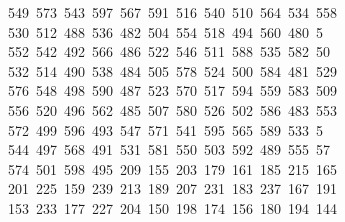 \begin{tabbing}
\>\ 549\ 573\ 543\ 597\ 567\ 591\ 516\ 540\ 510\ 564\ 534\ 558\ \\[0pt]
\ 530\ 512\ 488\ 536\ 482\ 504\ 554\ 518\ 494\ 560\ 480\ 5\\[0pt]
\ 552\ 542\ 492\ 566\ 486\ 522\ 546\ 511\ 588\ 535\ 582\ 50\\[0pt]
\ 532\ 514\ 490\ 538\ 484\ 505\ 578\ 524\ 500\ 584\ 481\ 529\\[0pt]
\>\ 576\ 548\ 498\ 590\ 487\ 523\ 570\ 517\ 594\ 559\ 583\ 509\\[0pt]
\>\ 556\ 520\ 496\ 562\ 485\ 507\ 580\ 526\ 502\ 586\ 483\ 553\ \\[0pt]
\ 572\ 499\ 596\ 493\ 547\ 571\ 541\ 595\ 565\ 589\ 533\ 5\\[0pt]
\ 544\ 497\ 568\ 491\ 531\ 581\ 550\ 503\ 592\ 489\ 555\ 57\\[0pt]
\ 574\ 501\ 598\ 495\ 209\ 155\ 203\ 179\ 161\ 185\ 215\ 165\\[0pt]
\>\ 201\ 225\ 159\ 239\ 213\ 189\ 207\ 231\ 183\ 237\ 167\ 191\\[0pt]
\>\ 153\ 233\ 177\ 227\ 204\ 150\ 198\ 174\ 156\ 180\ 194\ 144\ \\[0pt]

\end{tabbing}
